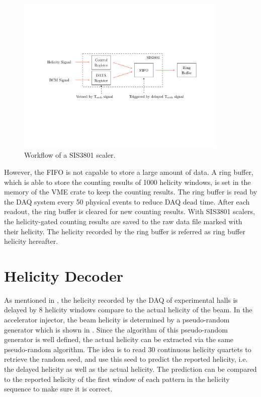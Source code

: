 \begin{figure}[tb!]
  \centering
  \includegraphics[width=0.9\textwidth]{figs/sis3801.pdf}
  \caption{Workflow of a SIS3801 scaler. \label{A1S1F1}}
\end{figure}

However, the FIFO is not capable to store a large amount of data. A ring buffer, which is able to store the counting results of 1000 helicity windows, is set in the memory of the VME crate to keep the counting results. The ring buffer is read by the DAQ system every 50 physical events to reduce DAQ dead time. After each readout, the ring buffer is cleared for new counting results. With SIS3801 scalers, the helicity-gated counting results are saved to the raw data file marked with their helicity. The helicity recorded by the ring buffer is referred as ring buffer helicity hereafter.

\section{Helicity Decoder}
\label{A1S2}

As mentioned in , the helicity recorded by the DAQ of experimental halls is delayed by 8 helicity windows compare to the actual helicity of the beam. In the accelerator injector, the beam helicity is determined by a pseudo-random generator which is shown in . Since the algorithm of this pseudo-random generator is well defined, the actual helicity can be extracted via the same pseudo-random algorithm. The idea is to read 30 continuous helicity quartets to retrieve the random seed, and use this seed to predict the reported helicity, i.e. the delayed helicity as well as the actual helicity. The prediction can be compared to the reported helicity of the first window of each pattern in the helicity sequence to make sure it is correct.

